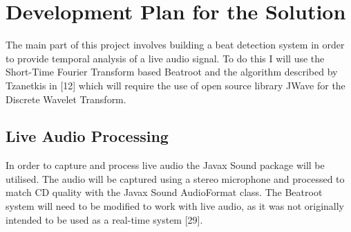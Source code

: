 \documentclass[a4paper, 11pt]{article}
\begin{document}
\maketitle{} 
\section{Development Plan for the Solution}

The main part of this project involves building a beat detection system in order to provide temporal analysis of a live audio signal. To do this I will use the Short-Time Fourier Transform based Beatroot and the algorithm described by Tzanetkis in [12] which will require the use of open source library JWave for the Discrete Wavelet Transform. 

\subsection{Live Audio Processing}
In order to capture and process live audio the Javax Sound package will be utilised. The audio will be captured using a stereo microphone and processed to match CD quality with the Javax Sound AudioFormat class. The Beatroot system will need to be modified to work with live audio, as it was not originally intended to be used as a real-time system [29].

\end{document}
